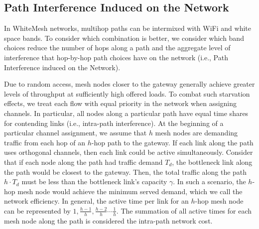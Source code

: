 \subsection{Path Interference Induced on the Network}
\label{subsec:PEN}

In WhiteMesh networks, multihop paths can be intermixed with WiFi and 
white space bands.  To consider which combination is better, we consider
which band choices reduce the number of hops along a path and the 
aggregate level of interference that hop-by-hop path choices have
on the network (i.e., Path Interference induced on the Network).


Due to random access, mesh nodes closer to the gateway generally achieve
greater levels of throughput at sufficiently high offered loads. To combat such
starvation effects, we treat each flow with equal priority in the network when
assigning channels. In particular, all nodes along a particular path have equal 
time shares for contending links (i.e., intra-path interference). At the beginning of 
a particular channel assignment, we assume that $h$ mesh nodes are demanding
traffic from each hop of an $h$-hop path to the gateway. If each link along the 
path uses orthogonal channels, then each link could be active simultaneously. 
Consider that if each node along the path had traffic demand $T_d$, the bottleneck 
link along the path would be closest to the gateway. Then, the total traffic along 
the path $h \cdot T_d$ must be less than the bottleneck link's capacity $\gamma$. 
In such a scenario, the $h$-hop mesh node would achieve the minimum served demand,
which we call the network efficiency. In general, the active time per link for an
$h$-hop mesh node can be represented by $1,\frac{h-1}{h},\frac{h-2}{h}\cdots \frac{1}{h}$.
The summation of all active times for each mesh node along the path is considered the
intra-path network cost.

